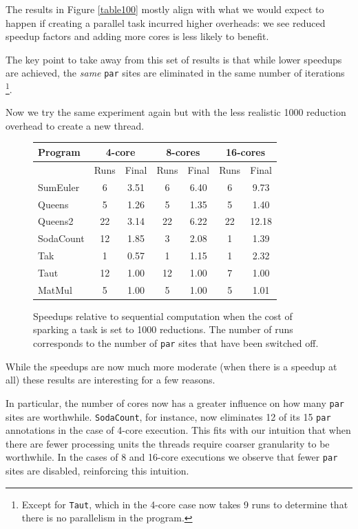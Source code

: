 The results in Figure \ref{table100} mostly align with what we would expect to
happen if creating a parallel task incurred higher overheads: we see reduced
speedup factors and adding more cores is less likely to benefit.

The key point to take away from this set of results is that while lower speedups
are achieved, the \emph{same} \verb-par- sites are eliminated in the same
number of iterations \footnote{Except for \texttt{Taut}, which in the 4-core case now
takes 9 runs to determine that there is no parallelism in the program.}.

Now we try the same experiment again but with the less realistic 1000 reduction
overhead to create a new thread.

\begin{figure}[ht]
\centering
  \begin{tabular}{ |l||c c|c c|c c| }
    \hline
    Program & \multicolumn{2}{c|}{4-core} & \multicolumn{2}{c|}{8-cores} & \multicolumn{2}{c|}{16-cores} \\
    \hline
            & Runs & Final     & Runs & Final      & Runs & Final \\
    \hline
    SumEuler  & 6    & 3.51      & 6    & 6.40       & 6    & 9.73     \\
    Queens    & 5    & 1.26      & 5    & 1.35       & 5    & 1.40  \\
    Queens2   & 22   & 3.14      & 22   & 6.22       & 22   & 12.18  \\
    SodaCount & 12   & 1.85      & 3    & 2.08       & 1    & 1.39    \\
    Tak       & 1    & 0.57      & 1    & 1.15       & 1    & 2.32   \\
    Taut      & 12   & 1.00      & 12   & 1.00       & 7    & 1.00  \\
    MatMul    & 5    & 1.00      & 5    & 1.00       & 5    & 1.01   \\
    \hline
  \end{tabular}
\caption{Speedups relative to sequential computation when the cost of sparking
        a task is set to 1000 reductions. The number of runs corresponds to the
        number of \texttt{par} sites that have been switched off.}
\label{table1000}
\end{figure}

While the speedups are now much more moderate (when there is a speedup at all)
these results are interesting for a few reasons.

In particular, the number of cores now has a greater influence on how many
\verb-par- sites are worthwhile.  \texttt{SodaCount}, for instance, now eliminates 12 of
its 15 \verb-par- annotations in the case of 4-core execution. This fits with
our intuition that when there are fewer processing units the threads require
coarser granularity to be worthwhile. In the cases of 8 and 16-core executions
we observe that fewer \verb-par- sites are disabled, reinforcing this
intuition.

